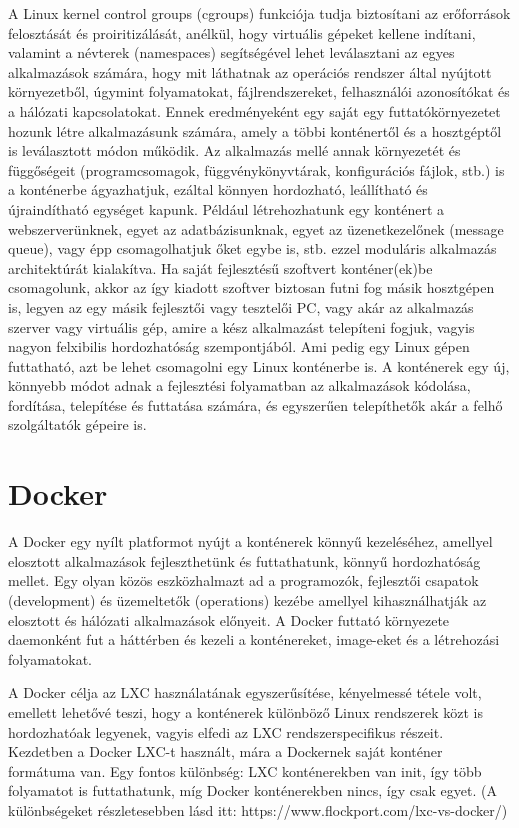 \documentclass[a4paper]{article}
\begin{document}
A Linux kernel control groups (cgroups) funkciója tudja biztosítani az erőforrások felosztását és proiritizálását, anélkül, hogy virtuális gépeket kellene indítani, valamint a névterek (namespaces) segítségével lehet leválasztani az egyes alkalmazások számára, hogy mit láthatnak az operációs rendszer által nyújtott környezetből, úgymint folyamatokat, fájlrendszereket, felhasználói azonosítókat és a hálózati kapcsolatokat. Ennek eredményeként egy saját egy futtatókörnyezetet hozunk létre alkalmazásunk számára, amely a többi konténertől és a hosztgéptől is leválasztott módon működik. Az alkalmazás mellé annak környezetét és függőségeit (programcsomagok, függvénykönyvtárak, konfigurációs fájlok, stb.) is a konténerbe ágyazhatjuk, ezáltal könnyen hordozható, leállítható és újraindítható egységet kapunk. Például létrehozhatunk egy konténert a webszerverünknek, egyet az adatbázisunknak, egyet az üzenetkezelőnek (message queue), vagy épp csomagolhatjuk őket egybe is, stb. ezzel moduláris alkalmazás architektúrát kialakítva. Ha saját fejlesztésű szoftvert konténer(ek)be csomagolunk, akkor az így kiadott szoftver biztosan futni fog másik hosztgépen is, legyen az egy másik fejlesztői vagy tesztelői PC, vagy akár az alkalmazás szerver vagy virtuális gép, amire a kész alkalmazást telepíteni fogjuk, vagyis nagyon felxibilis hordozhatóság szempontjából. Ami pedig egy Linux gépen futtatható, azt be lehet csomagolni egy Linux konténerbe is. A konténerek egy új, könnyebb módot adnak a fejlesztési folyamatban az alkalmazások kódolása, fordítása, telepítése és futtatása számára, és egyszerűen telepíthetők akár a felhő szolgáltatók gépeire is.

\section{Docker}

A Docker egy nyílt platformot nyújt a konténerek könnyű kezeléséhez, amellyel elosztott alkalmazások fejleszthetünk és futtathatunk, könnyű hordozhatóság mellet. Egy olyan közös eszközhalmazt ad a programozók, fejlesztői csapatok (development) és üzemeltetők (operations) kezébe amellyel kihasználhatják az elosztott és hálózati alkalmazások előnyeit. A Docker futtató környezete daemonként fut a háttérben és kezeli a konténereket, image-eket és a létrehozási folyamatokat.

A Docker célja az LXC használatának egyszerűsítése, kényelmessé tétele volt, emellett lehetővé teszi, hogy a konténerek különböző Linux rendszerek közt is hordozhatóak legyenek, vagyis elfedi az LXC rendszerspecifikus részeit. Kezdetben a Docker LXC-t használt, mára a Dockernek saját konténer formátuma van. Egy fontos különbség: LXC konténerekben van init, így több folyamatot is futtathatunk, míg Docker konténerekben nincs, így csak egyet. (A különbségeket részletesebben lásd itt: https://www.flockport.com/lxc-vs-docker/)
\end{document}
